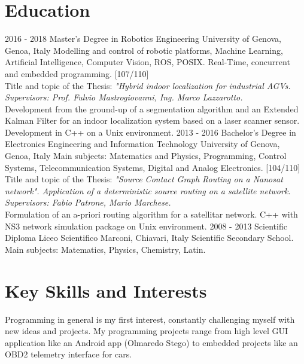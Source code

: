 \documentclass[]{friggeri-cv}
\begin{document}
\section{Education}
\begin{entrylist}
  \entry
    {2016 - 2018}
    {Master's Degree in Robotics Engineering}
    {University of Genova, Genoa, Italy}
    {Modelling and control of robotic platforms, Machine Learning, Artificial Intelligence, Computer Vision, ROS, POSIX. Real-Time, concurrent and embedded programming. [107/110]\\ Title and topic of the Thesis: 
    \emph{"Hybrid indoor localization for industrial AGVs. Supervisors: Prof. Fulvio Mastrogiovanni, Ing. Marco Lazzarotto.}\\ Development from the ground-up of a segmentation algorithm and an Extended Kalman Filter for an indoor localization system based on a laser scanner sensor. Development in C++ on a Unix environment.}
  \entry
    {2013 - 2016}
    {Bachelor's Degree in Electronics Engineering and Information Technology}
    {University of Genova, Genoa, Italy}
    {Main subjects: Matematics and Physics, Programming, Control Systems, Telecommunication Systems, Digital and Analog Electronics. [104/110]\\ Title and topic of the Thesis: 
    \emph{"Source Contact Graph Routing on a Nanosat network".
    Application of a deterministic source routing on a satellite network. Supervisors: Fabio Patrone, Mario Marchese.}\\ Formulation of an a-priori routing algorithm for a satellitar network. C++ with NS3 network simulation package on Unix environment. }
  \entry
    {2008 - 2013}
    {Scientific Diploma}
    {Liceo Scientifico Marconi, Chiavari, Italy}
    {Scientific Secondary School.\\
    Main subjects: Matematics, Physics, Chemistry, Latin.}
\end{entrylist}

\section{Key Skills and Interests}
	Programming in general is my first interest, constantly challenging myself with new ideas and projects. My programming projects range from high level GUI application like an Android app (Olmaredo Stego) to  embedded projects like an OBD2 telemetry interface for cars. 
	
\end{document}
